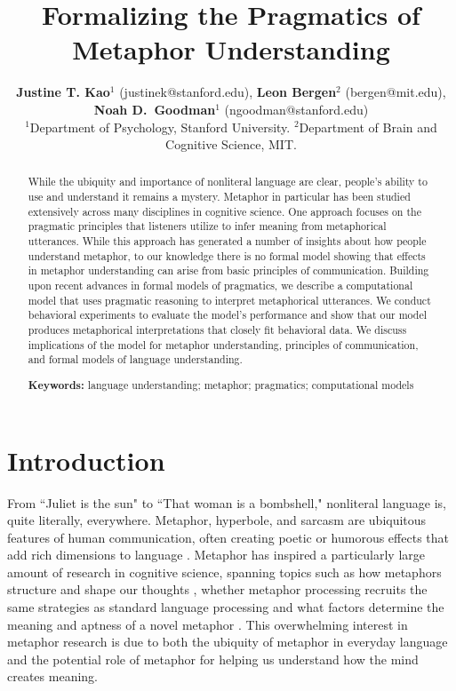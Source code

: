 \documentclass[10pt,letterpaper]{article}
\title{Formalizing the Pragmatics of Metaphor Understanding}
\author{{\large {\bf Justine T. Kao$^1$} (justinek@stanford.edu)}, {\large {\bf Leon Bergen$^2$} (bergen@mit.edu)}, {\large {\bf Noah D.~Goodman$^1$} (ngoodman@stanford.edu)}\\
  $^1$Department of Psychology, Stanford University. $^2$Department of Brain and Cognitive Science, MIT. }
\begin{document}
\maketitle
\begin{abstract}
While the ubiquity and importance of nonliteral language are clear, people's ability to use and understand it remains a mystery. Metaphor in particular has been studied extensively across many disciplines in cognitive science. One approach focuses on the pragmatic principles that listeners utilize to infer meaning from metaphorical utterances. While this approach has generated a number of insights about how people understand metaphor, to our knowledge there is no formal model showing that effects in metaphor understanding can arise from basic principles of communication. Building upon recent advances in formal models of pragmatics, we describe a computational model that uses pragmatic reasoning to interpret metaphorical utterances. We conduct behavioral experiments to evaluate the model's performance and show that our model produces metaphorical interpretations that closely fit behavioral data. We discuss implications of the model for metaphor understanding, principles of communication, and formal models of language understanding.

\textbf{Keywords:} 
language understanding; metaphor; pragmatics; computational models
\end{abstract}


\section{Introduction}
From ``Juliet is the sun" to ``That woman is a bombshell," nonliteral language is, quite literally, everywhere. Metaphor, hyperbole, and sarcasm are ubiquitous features of human communication, often creating poetic or humorous effects that add rich dimensions to language \cite{glucksberg2001understanding, pilkington2000poetic, lakoff2009more, roberts1994people}. Metaphor has inspired a particularly large amount of research in cognitive science, spanning topics such as how metaphors structure and shape our thoughts \cite{ortony1993metaphor, lakoff1993contemporary, thibodeau2011metaphors}, whether metaphor processing recruits the same strategies as standard language processing \cite{giora1997understanding, gibbs2002new, glucksberg1993metaphors} and what factors determine the meaning and aptness of a novel metaphor \cite{blasko1993effects, tourangeau1981aptness, kintsch2002metaphor}. This overwhelming interest in metaphor research is due to both the ubiquity of metaphor in everyday language and the potential role of metaphor for helping us understand how the mind creates meaning. 
\end{document}
